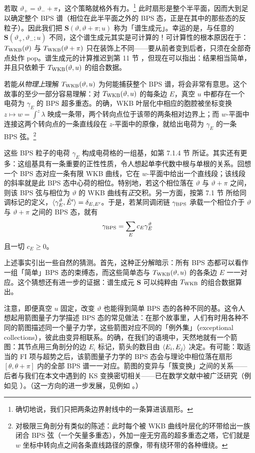 若取 $\vartheta_+=\vartheta_-+\pi$，这个策略就格外有力。\footnote{确切地说，我们只把两条边界射线中的一条算进该扇形。} 此时扇形是整个半平面，因而大到足以确定整个 BPS 谱（相位在此半平面之外的 BPS 态，正是在其中的那些态的反粒子）。因此我们把 $\mathbf{S}(\vartheta,\vartheta+\pi;u)$ 称为「谱生成元」。幸运的是，与任意的 $\mathbf{S}(\vartheta_+,\vartheta_-;u)$ 不同，这个谱生成元其实是可计算的！可计算性的根本原因在于：$T_{\rm WKB}(\vartheta)$ 与 $T_{\rm WKB}(\vartheta+\pi)$ 只在装饰上不同——要从前者变到后者，只须在全部奇点处作 pop。谱生成元的计算推迟到第 11 节%
，但现在可以指出：结果相当简单，并且只依赖于 $T_{\rm WKB}(\vartheta,u)$ 的组合数据。

若能\emph{从物理上}理解 $T_{\rm WKB}(\vartheta,u)$ 为何能捕获整个 BPS 谱，将会非常有意思。这个故事的至少一部分容易理解：对 $T_{\rm WKB}(\vartheta,u)$ 的每条边 $E$，真空 $u$ 中都存在一个电荷为 $\gamma_E$ 的 BPS 超多重态。的确，WKB 叶层化中相应的胞腔被坐标变换 $z\mapsto w=\int^z\lambda$ 映成一条带，两个转向点位于该带的两条相对边界上；而 $w$-平面中连接这两个转向点的一条直线段在 $z$-平面中的原像，就给出电荷为 $\gamma_E$ 的一条 BPS 弦。\footnote{对极限三角剖分有类似的陈述：此时每个被 WKB 曲线叶层化的环带给出一族闭合 BPS 弦（一个矢量多重态），外加一座无穷高的超多重态之塔，它们就是 $w$ 坐标中转向点之间各条直线路径的原像，带有绕环带的各种缠绕。}

这些 BPS 粒子的电荷 $\gamma_E$ 构成电荷格的一组基，如第 7.1.4 节%
所证。其实还有更多：这组基具有一条重要的正性性质，令人想起单李代数中根与单根的关系。回想一个 BPS 态对应一条有限 WKB 曲线，它在 $w$-平面中给出一个直线段；该线段的斜率就是此 BPS 态中心荷的相位。特别地，若这个相位落在 $\vartheta$ 与 $\vartheta+\pi$ 之间，则该 BPS 弦与相位为 $\vartheta$ 的 WKB 曲线有\emph{正}交积。另一方面，按第 7.1 节%
所给同调标记的定义，$\langle \gamma_E^\vartheta, \hat E' \rangle=\delta_{E,E'}$。于是，若某同调闭链 $\gamma_{\rm BPS}$ 承载一个相位介于 $\vartheta$ 与 $\vartheta+\pi$ 之间的 BPS 态，就有
\begin{equation}
\gamma_{\rm BPS} = \sum_E c_E \gamma_E^{\vartheta}
\end{equation}
且一切 $c_E\ge0$。

上述事实引出一些自然的猜测。首先，这种正分解暗示：所有 BPS 态都可以看作一组「简单」BPS 态的束缚态，而这些简单态与 $T_{\rm WKB}(\vartheta,u)$ 的各条边 $E$ 一一对应。这个猜想还有进一步的证据：谱生成元 $\mathbf{S}$ 可以纯粹由 $T_{\rm WKB}$ 的组合数据算出。

注意，即便真空 $u$ 固定，改变 $\vartheta$ 也能得到简单 BPS 态的各种不同的基。这令人想起用箭图量子力学描述 BPS 态的常见做法：在那个故事里，人们有时用各种不同的箭图描述同一个量子力学，这些箭图对应不同的「例外集」（exceptional collections），彼此由变异相联系。的确，在我们的语境中，天然地就有一个箭图：其节点用三角剖分的边 $E_i$ 标记，箭头的数目由 $\langle E_i,E_j \rangle$ 决定。有可能：取适当的 FI 项与超势之后，该箭图量子力学的 BPS 态会与理论中相位落在扇形 $[\theta,\theta+\pi]$ 内的全部 BPS 谱一一对应。箭图的变异与「簇变换」之间的关系——后者与我们在本文中遇到的 KS 变换密切相关——已在数学文献中被广泛研究（例如见 \cite{cluster-intro}）。（这一方向的进一步发展，见例如 \cite{Gaiotto:2010be,Cecotti:2010fi,Cecotti:2011rv}。）
